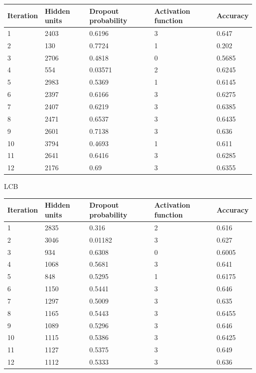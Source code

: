\documentclass[12pt,fleqn]{article}
\begin{document}
\begin{table}[H]
	\begin{tabular}{|l|l|l|l|l|}
		\hline
		Iteration & Hidden units & Dropout probability & Activation function & Accuracy \\ \hline
1 & 2403 & 0.6196 & 3 & 0.647 \\ \hline 

2 & 130 & 0.7724 & 1 & 0.202 \\ \hline 

3 & 2706 & 0.4818 & 0 & 0.5685 \\ \hline 

4 & 554 & 0.03571 & 2 & 0.6245 \\ \hline 

5 & 2983 & 0.5369 & 1 & 0.6145 \\ \hline 

6 & 2397 & 0.6166 & 3 & 0.6275 \\ \hline 

7 & 2407 & 0.6219 & 3 & 0.6385 \\ \hline 

8 & 2471 & 0.6537 & 3 & 0.6435 \\ \hline 

9 & 2601 & 0.7138 & 3 & 0.636 \\ \hline 

10 & 3794 & 0.4693 & 1 & 0.611 \\ \hline 

11 & 2641 & 0.6416 & 3 & 0.6285 \\ \hline 

12 & 2176 & 0.69 & 3 & 0.6355 \\ \hline 

	\end{tabular}
\end{table}



LCB
\begin{table}[H]
	\begin{tabular}{|l|l|l|l|l|}
		\hline
		Iteration & Hidden units & Dropout probability & Activation function & Accuracy \\ \hline
		1 & 2835 & 0.316 & 2 & 0.616 \\ \hline 
		2 & 3046 & 0.01182 & 3 & 0.627 \\ \hline 
		3 & 934 & 0.6308 & 0 & 0.6005 \\ \hline 
		4 & 1068 & 0.5681 & 3 & 0.641 \\ \hline 
		5 & 848 & 0.5295 & 1 & 0.6175 \\ \hline 
		6 & 1150 & 0.5441 & 3 & 0.646 \\ \hline 
		7 & 1297 & 0.5009 & 3 & 0.635 \\ \hline 
		8 & 1165 & 0.5443 & 3 & 0.6455 \\ \hline 
		9 & 1089 & 0.5296 & 3 & 0.646 \\ \hline 
		10 & 1115 & 0.5386 & 3 & 0.6425 \\ \hline 
		11 & 1127 & 0.5375 & 3 & 0.649 \\ \hline 
		12 & 1112 & 0.5333 & 3 & 0.636 \\ \hline 
	\end{tabular}
\end{table}
 
\end{document}
